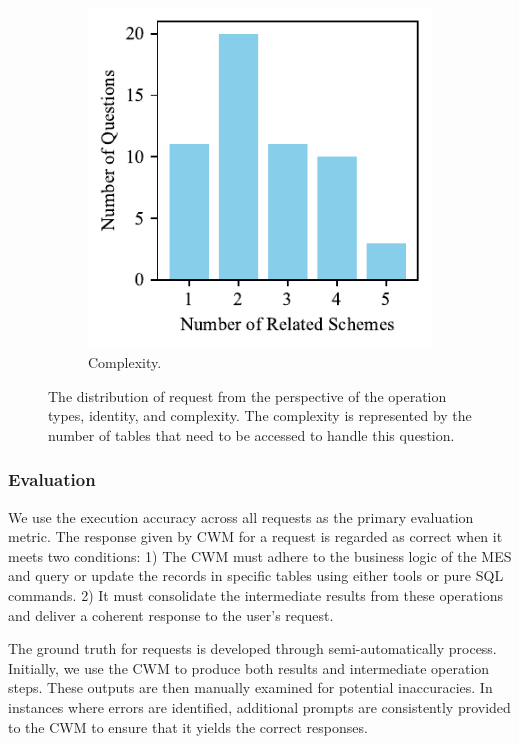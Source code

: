 \documentclass[preprint,12pt]{elsarticle}
\begin{document}
\begin{figure}
\begin{subfigure}{0.3\textwidth}
    \includegraphics[width=\linewidth]{figs/questions_scheme_num.pdf}
    \caption{Complexity.}
    \label{fig:complexity}
  \end{subfigure}
  \caption{The distribution of request from the perspective of the operation types, identity, and complexity. The complexity is represented by the number of tables that need to be accessed to handle this question.}
\end{figure}

\subsubsection{Evaluation}

We use the execution accuracy across all requests as the primary evaluation metric.
The response given by CWM for a request is regarded as correct when it meets two conditions: 
1) The CWM must adhere to the business logic of the MES and query or update the records in specific tables using either tools or pure SQL commands. 
2) It must consolidate the intermediate results from these operations and deliver a coherent response to the user's request.


The ground truth for requests is developed through semi-automatically process.
Initially, we use the CWM to produce both results and intermediate operation steps.
These outputs are then manually examined for potential inaccuracies.
In instances where errors are identified, additional prompts are consistently provided to the CWM to ensure that it yields the correct responses.
\end{document}
